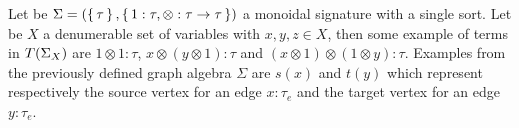 \begin{example}[Terms]
  Let be $\Sigma = (\set{\tau}, \set{1 : \tau, \otimes : \tau \to \tau})$ a monoidal signature with a single sort. Let
  be $X$ a denumerable set of variables with $x, y, z \in X$, then some example of terms in $T({\Sigma}_{X})$ are $1
  \otimes 1 : \tau$, $x \otimes (y \otimes 1) : \tau$ and $(x \otimes 1) \otimes (1 \otimes y) : \tau$. Examples from
  the previously defined graph algebra $\Sigma$ are $s(x)$ and $t(y)$ which represent respectively the source vertex for
  an edge $x : \tau_e$ and the target vertex for an edge $y : \tau_e$.
\end{example}
